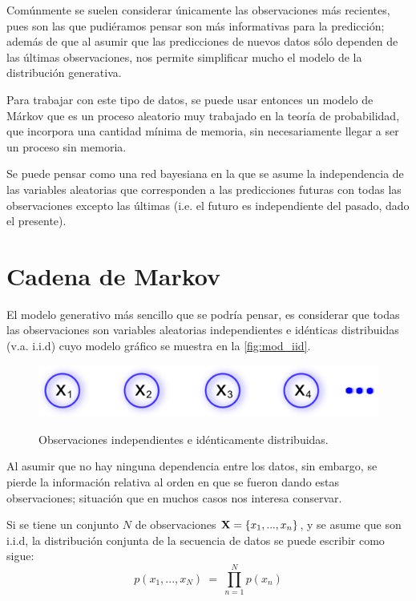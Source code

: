 Comúnmente se suelen considerar únicamente las observaciones más recientes, pues son las que pudiéramos pensar son más informativas para la predicción; además de que al asumir que las predicciones de nuevos datos sólo dependen de las últimas observaciones, nos permite simplificar mucho el modelo de la distribución generativa.

Para trabajar con este tipo de datos, se puede usar entonces un modelo de Márkov que es un proceso aleatorio muy trabajado en la teoría de probabilidad, que incorpora una cantidad mínima de memoria, sin necesariamente llegar a ser un proceso sin memoria.

Se puede pensar como una red bayesiana en la que se asume la independencia de las variables aleatorias que corresponden a las predicciones futuras con todas las observaciones excepto las últimas (i.e. el futuro es independiente del pasado, dado el presente).

\section{Cadena de Markov}


El modelo generativo más sencillo que se podría pensar, es considerar que todas las observaciones son variables aleatorias independientes e idénticas distribuidas (v.a. i.i.d) cuyo modelo gráfico se muestra en la \autoref{fig:mod_iid}.

\begin{figure}[bt]
        \myfloatalign
        {\includegraphics[width=0.6\linewidth]{gfx/chap2/mod-iid}}        
        \caption{Observaciones independientes e idénticamente distribuidas.}
        \label{fig:mod_iid}
\end{figure}

Al asumir que no hay ninguna dependencia entre los datos, sin embargo, se pierde la información relativa al orden en que se fueron dando estas observaciones; situación que en muchos casos nos interesa conservar.

Si se tiene un conjunto $N$ de observaciones $\textbf{X} = \lbrace x_1, ..., x_n \rbrace$, y se asume que son i.i.d, la distribución conjunta de la secuencia de datos se puede escribir como sigue:
\begin{equation}
\label{eqn:2-1}
p(x_1, ..., x_N) ~=~ \prod_{n=1}^N p(x_n)
\end{equation}

